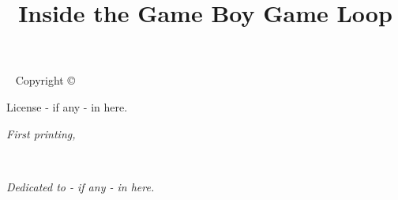 
\maketitle
\title{Inside the Game Boy Game Loop}

\newpage
\begin{fullwidth}
~\vfill
\thispagestyle{empty}
\setlength{\parindent}{0pt}
\setlength{\parskip}{\baselineskip}
Copyright \copyright\ \the\year\ \thanklessauthor

\par{}

\par{}

\par License - if any - in here.

\par\textit{First printing, \monthyear}
\end{fullwidth}

\tableofcontents


\cleardoublepage
~\vfill
\begin{doublespace}
\noindent\fontsize{18}{22}\selectfont\itshape
\nohyphenation
Dedicated to - if any - in here.
\end{doublespace}
\vfill
\vfill

\cleardoublepage

